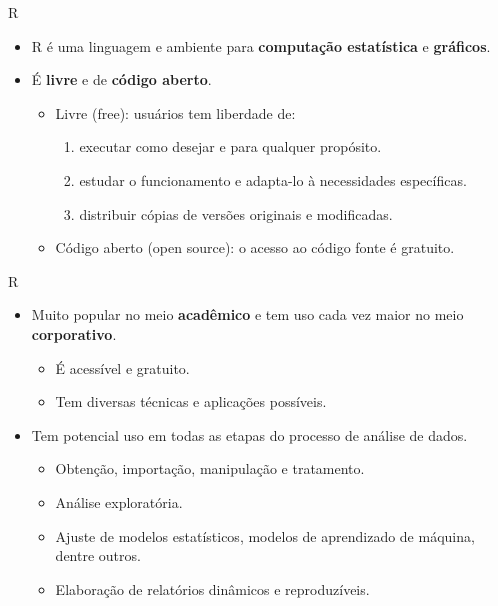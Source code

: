 \documentclass[
  ignorenonframetext,
  serif,
  professionalfont,
  usenames,
  dvipsnames,
  aspectratio = 169]{beamer}
\providecommand{\tightlist}{%
  \setlength{\itemsep}{0pt}\setlength{\parskip}{0pt}}
\renewcommand{\tightlist}{%
  \setlength{\itemsep}{0\baselineskip}
  \setlength{\parskip}{0.25\baselineskip}
}
\begin{document}
\begin{frame}{R}
\protect\hypertarget{r}{}
\begin{itemize}
\item
  R é uma linguagem e ambiente para \textbf{computação estatística} e
  \textbf{gráficos}.
\item
  É \textbf{livre} e de \textbf{código aberto}.

  \begin{itemize}
  \tightlist
  \item
    Livre (free): usuários tem liberdade de:

    \begin{enumerate}
    \tightlist
    \item
      executar como desejar e para qualquer propósito.
    \item
      estudar o funcionamento e adapta-lo à necessidades específicas.
    \item
      distribuir cópias de versões originais e modificadas.
    \end{enumerate}
  \item
    Código aberto (open source): o acesso ao código fonte é gratuito.
  \end{itemize}
\end{itemize}
\end{frame}

\begin{frame}{R}
\protect\hypertarget{r-1}{}
\begin{itemize}
\tightlist
\item
  Muito popular no meio \textbf{acadêmico} e tem uso cada vez maior no
  meio \textbf{corporativo}.

  \begin{itemize}
  \tightlist
  \item
    É acessível e gratuito.
  \item
    Tem diversas técnicas e aplicações possíveis.
  \end{itemize}
\item
  Tem potencial uso em todas as etapas do processo de análise de dados.

  \begin{itemize}
  \tightlist
  \item
    Obtenção, importação, manipulação e tratamento.
  \item
    Análise exploratória.
  \item
    Ajuste de modelos estatísticos, modelos de aprendizado de máquina,
    dentre outros.
  \item
    Elaboração de relatórios dinâmicos e reproduzíveis.
  \end{itemize}
\end{itemize}
\end{frame}
\end{document}
